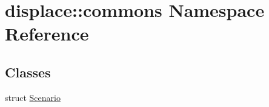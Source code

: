 \hypertarget{namespacedisplace_1_1commons}{}\section{displace\+::commons Namespace Reference}
\label{namespacedisplace_1_1commons}
\subsection*{Classes}
\begin{DoxyCompactItemize}
\item 
struct \mbox{\hyperlink{structdisplace_1_1commons_1_1_scenario}{Scenario}}
\end{DoxyCompactItemize}
